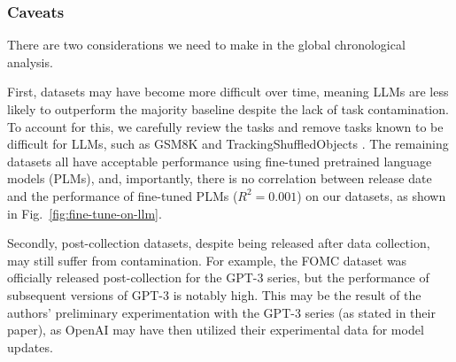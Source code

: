 \documentclass[letterpaper]{article} %
\newcommand{\nilay}[1]{}
\newcommand{\jmf}[1]{}      %
\begin{document}
\subsubsection{Caveats}

\jmf{talk about FOMC dataset: that they used GPT-3 series, and it seems it may be contaminated}

There are two considerations we need to make in the global chronological analysis.

First, datasets may have become more difficult over time, meaning LLMs are less likely to outperform the majority baseline despite the lack of task contamination. To account for this, we carefully review the tasks and remove tasks known to be difficult for LLMs, such as GSM8K \cite{Cobbe2021} and TrackingShuffledObjects \cite{Srivastava2023}. The remaining datasets all have acceptable performance using fine-tuned pretrained language models (PLMs), and, importantly, there is no correlation between release date and the performance of fine-tuned PLMs ($R^2 = 0.001$) on our datasets, as shown in Fig.~\ref{fig:fine-tune-on-llm}.

Secondly, post-collection datasets, despite being released after data collection, may still suffer from contamination. For example, the FOMC dataset \cite{shah2023} was officially released post-collection for the GPT-3 series, but the performance of subsequent versions of GPT-3 is notably high. This may be the result of the authors' preliminary experimentation with the GPT-3 series (as stated in their paper), as OpenAI may have then utilized their experimental data for model updates.\nilay{Is there any evidence for this? Seems just like speculation without proof, which is fine, but should be clear about it.}

\end{document}
